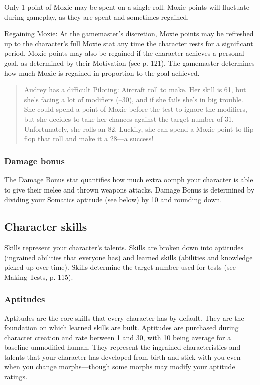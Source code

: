 Only 1 point of Moxie may be spent on a single roll. Moxie points will fluctuate during gameplay, as they are spent and sometimes regained.

Regaining Moxie: At the gamemaster's discretion, Moxie points may be refreshed up to the character's full Moxie stat any time the character rests for a significant period. Moxie points may also be regained if the character achieves a personal goal, as determined by their Motivation (see p. 121). The gamemaster determines how much Moxie is regained in proportion to the goal achieved.

\begin{quotation}
Audrey has a difficult Piloting: Aircraft roll to make. Her skill is 61, but she's facing a lot of modifiers (–30), and if she fails she's in big trouble. She could spend a point of Moxie before the test to ignore the modifiers, but she decides to take her chances against the target number of 31. Unfortunately, she rolls an 82. Luckily, she can spend a Moxie point to flip-flop that roll and make it a 28—a success!
\end{quotation}

\subsubsection{Damage bonus}
\label{sec:damage-bonus}

The Damage Bonus stat quantifies how much extra oomph your character is able to give their melee and thrown weapons attacks. Damage Bonus is determined by dividing your Somatics aptitude (see below) by 10 and rounding down.

\subsection{Character skills}
\label{sec:character-skills}

Skills represent your character's talents. Skills are broken down into aptitudes (ingrained abilities that everyone has) and learned skills (abilities and knowledge picked up over time). Skills determine the target number used for tests (see Making Tests, p. 115).

\subsubsection{Aptitudes}
\label{sec:aptitudes}

Aptitudes are the core skills that every character has by default. They are the foundation on which learned skills are built. Aptitudes are purchased during character creation and rate between 1 and 30, with 10 being average for a baseline unmodified human. They represent the ingrained characteristics and talents that your character has developed from birth and stick with you even when you change morphs—though some morphs may modify your aptitude ratings.


